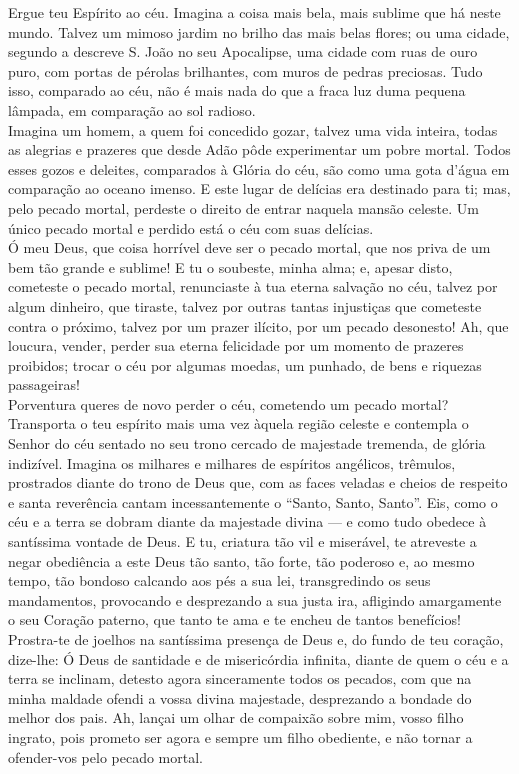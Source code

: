 \documentclass{book}
\begin{document}
\begin{flushleft}
    Ergue teu Espírito ao céu. Imagina a coisa mais bela, mais sublime que há neste mundo. Talvez um mimoso jardim no brilho das mais belas flores; ou uma cidade, segundo a descreve S. João no seu Apocalipse, uma cidade com ruas de ouro puro, com portas de pérolas brilhantes, com muros de pedras preciosas. Tudo isso, comparado ao céu, não é mais nada do que a fraca luz duma pequena lâmpada, em comparação ao sol radioso.
    \vspace{.2cm} \\
    Imagina um homem, a quem foi concedido gozar, talvez uma vida inteira, todas as alegrias e prazeres que desde Adão pôde experimentar um pobre mortal. Todos esses gozos e deleites, comparados à Glória do céu, são como uma gota d'água em comparação ao oceano imenso. E este lugar de delícias era destinado para ti; mas, pelo pecado mortal, perdeste o direito de entrar naquela mansão celeste. Um único pecado mortal e perdido está o céu com suas delícias.
    \vspace{.2cm} \\
    Ó meu Deus, que coisa horrível deve ser o pecado mortal, que nos priva de um bem tão grande e sublime! E tu o soubeste, minha alma; e, apesar disto, cometeste o pecado mortal, renunciaste à tua eterna salvação no céu, talvez por algum dinheiro, que tiraste, talvez por outras tantas injustiças que cometeste contra o próximo, talvez por um prazer ilícito, por um pecado desonesto! Ah, que loucura, vender, perder sua eterna felicidade por um momento de prazeres proibidos; trocar o céu por algumas moedas, um punhado, de bens e riquezas passageiras!
    \vspace{.2cm} \\
    Porventura queres de novo perder o céu, cometendo um pecado mortal? Transporta o teu espírito mais uma vez àquela região celeste e contempla o Senhor do céu sentado no seu trono cercado de majestade tremenda, de glória indizível. Imagina os milhares e milhares de espíritos angélicos, trêmulos, prostrados diante do trono de Deus que, com as faces veladas e cheios de respeito e santa reverência cantam incessantemente o ``Santo, Santo, Santo''. Eis, como o céu e a terra se dobram diante da majestade divina --- e como tudo obedece à santíssima vontade de Deus.
    \newpage
    E tu, criatura tão vil e miserável, te atreveste a negar obediência a este Deus tão santo, tão forte, tão poderoso e, ao mesmo tempo, tão bondoso calcando aos pés a sua lei, transgredindo os seus mandamentos, provocando e desprezando a sua justa ira, afligindo amargamente o seu Coração paterno, que tanto te ama e te encheu de tantos benefícios! Prostra-te de joelhos na santíssima presença de Deus e, do fundo de teu coração, dize-lhe: Ó Deus de santidade e de misericórdia infinita, diante de quem o céu e a terra se inclinam, detesto agora sinceramente todos os pecados, com que na minha maldade ofendi a vossa divina majestade, desprezando a bondade do melhor dos pais. Ah, lançai um olhar de compaixão sobre mim, vosso filho ingrato, pois prometo ser agora e sempre um filho obediente, e não tornar a ofender-vos pelo pecado mortal.
\end{flushleft}
\end{document}

